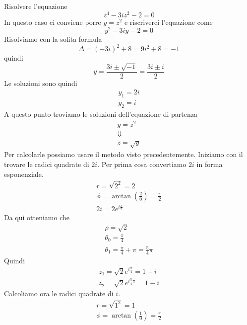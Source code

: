 \begin{example}
	Risolvere l'equazione
	\begin{equation*}
		z^4 - 3iz^2 - 2 = 0
	\end{equation*}
	In questo caso ci conviene porre $y = z^2$ e riscriverci l'equazione come
	\begin{equation*}
		y^2 - 3iy - 2 = 0
	\end{equation*}
	Risolviamo con la solita formula
	\begin{equation*}
		\Delta = (-3i)^2 + 8 = 9i^2 + 8 = -1
	\end{equation*}
	quindi
	\begin{equation*}
		y = \frac{3i \pm \sqrt{-1}}{2} = \frac{3i \pm i}{2}
	\end{equation*}
	Le soluzioni sono quindi
	\begin{gather*}
		y_1 = 2i \\
		y_2 = i
	\end{gather*}
	A questo punto troviamo le soluzioni dell'equazione di partenza
	\begin{gather*}
		y = z^2    \\
		\Downarrow \\
		z = \sqrt{y}
	\end{gather*}
	Per calcolarle possiamo usare il metodo visto precedentemente.
	Iniziamo con il trovare le radici quadrate di $2i$. Per prima cosa convertiamo $2i$ in
	forma esponenziale.
	\begin{gather*}
		r = \sqrt{2^2} = 2                            \\
		\phi = \arctan{\left(\frac{2}{0}\right)} = \frac{\pi}{2} \\
		2i = 2 e^{i \frac{\pi}{2}}
	\end{gather*}
	Da qui otteniamo che
	\begin{gather*}
		\rho = \sqrt{2}          \\
		\theta_0 = \frac{\pi}{4} \\
		\theta_1 = \frac{\pi}{4} + \pi = \frac{5}{4} \pi
	\end{gather*}
	Quindi
	\begin{gather*}
		z_1 = \sqrt{2} e^{i \frac{\pi}{4}} = 1 + i \\
		z_2 = \sqrt{2} e^{i \frac{5}{4} \pi} = 1 - i
	\end{gather*}
	Calcoliamo ora le radici quadrate di $i$.
	\begin{gather*}
		r = \sqrt{1^2} = 1                                         \\
		\phi = \arctan{\left( \frac{1}{0} \right)} = \frac{\pi}{2} \\

\end{gather*}
\end{example}
